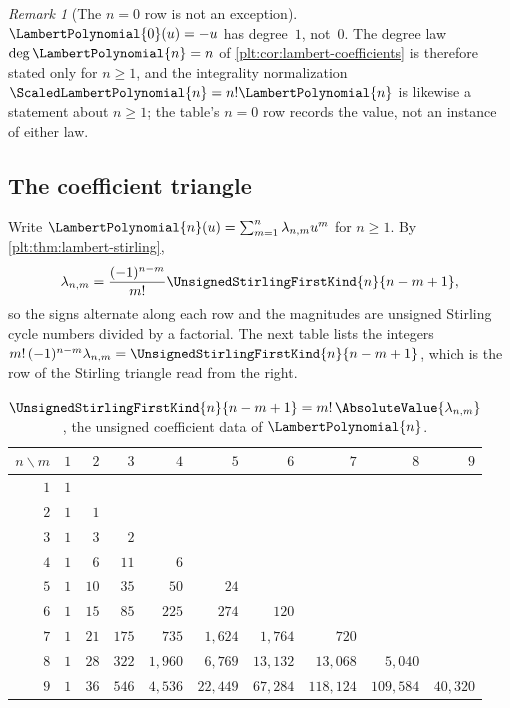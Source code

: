 \documentclass[11pt,oneside]{article}
\theoremstyle{plain}
\theoremstyle{definition}
\theoremstyle{remark}
\newtheorem{remark}[theorem]{Remark}
\newcommand{\stirlingone}[2]{\UnsignedStirlingFirstKind{#1}{#2}}
\newcommand{\LamP}[1]{\LambertPolynomial{#1}}
\newcommand{\LamPsc}[1]{\ScaledLambertPolynomial{#1}}
\begin{document}
\begin{remark}[The $n=0$ row is not an exception]
\label{plt:rmk:lambert-zero-row}
\(\LamP{0}(u)=-u\) has degree~\(1\), not~\(0\).  The degree law
\(\deg\LamP{n}=n\) of \cref{plt:cor:lambert-coefficients} is therefore stated
only for \(n\ge1\), and the integrality normalization
\(\LamPsc{n}=n!\LamP{n}\) is likewise a statement about \(n\ge1\); the table's
\(n=0\) row records the value, not an instance of either law.
\end{remark}

\subsection{The coefficient triangle}

Write \(\LamP{n}(u)=\sum_{m=1}^{n}\lambda_{n,m}u^{m}\) for \(n\ge1\).  By
\cref{plt:thm:lambert-stirling},
\[
 \lambda_{n,m}=\frac{(-1)^{n-m}}{m!}\stirlingone{n}{n-m+1},
\]
so the signs alternate along each row and the magnitudes are unsigned Stirling
cycle numbers divided by a factorial.  The next table lists the integers
\(m!\,(-1)^{n-m}\lambda_{n,m}=\stirlingone{n}{n-m+1}\), which is the row of the
Stirling triangle read from the right.

\begin{table}[htbp]\centering\small
\caption{$\stirlingone{n}{n-m+1}=m!\,\AbsoluteValue{\lambda_{n,m}}$, the unsigned coefficient data of $\LamP{n}$.}\label{plt:tab:lambert-triangle}
\begin{tabular}{@{}rrrrrrrrrr@{}}
\toprule
$n\backslash m$ & $1$ & $2$ & $3$ & $4$ & $5$ & $6$ & $7$ & $8$ & $9$\\
\midrule
$1$ & $1$ &  &  &  &  &  &  &  & \\
$2$ & $1$ & $1$ &  &  &  &  &  &  & \\
$3$ & $1$ & $3$ & $2$ &  &  &  &  &  & \\
$4$ & $1$ & $6$ & $11$ & $6$ &  &  &  &  & \\
$5$ & $1$ & $10$ & $35$ & $50$ & $24$ &  &  &  & \\
$6$ & $1$ & $15$ & $85$ & $225$ & $274$ & $120$ &  &  & \\
$7$ & $1$ & $21$ & $175$ & $735$ & $1{,}624$ & $1{,}764$ & $720$ &  & \\
$8$ & $1$ & $28$ & $322$ & $1{,}960$ & $6{,}769$ & $13{,}132$ & $13{,}068$ & $5{,}040$ & \\
$9$ & $1$ & $36$ & $546$ & $4{,}536$ & $22{,}449$ & $67{,}284$ & $118{,}124$ & $109{,}584$ & $40{,}320$\\
\bottomrule
\end{tabular}
\end{table}
\end{document}
